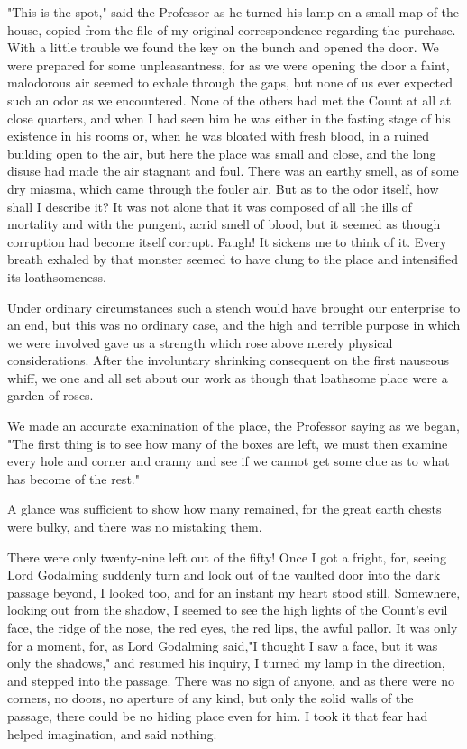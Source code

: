 "This is the spot," said the Professor as he turned his lamp on a small map of the house, copied from the file of my original correspondence regarding the purchase. With a little trouble we found the key on the bunch and opened the door. We were prepared for some unpleasantness, for as we were opening the door a faint, malodorous air seemed to exhale through the gaps, but none of us ever expected such an odor as we encountered. None of the others had met the Count at all at close quarters, and when I had seen him he was either in the fasting stage of his existence in his rooms or, when he was bloated with fresh blood, in a ruined building open to the air, but here the place was small and close, and the long disuse had made the air stagnant and foul. There was an earthy smell, as of some dry miasma, which came through the fouler air. But as to the odor itself, how shall I describe it? It was not alone that it was composed of all the ills of mortality and with the pungent, acrid smell of blood, but it seemed as though corruption had become itself corrupt. Faugh! It sickens me to think of it. Every breath exhaled by that monster seemed to have clung to the place and intensified its loathsomeness. 

Under ordinary circumstances such a stench would have brought our enterprise to an end, but this was no ordinary case, and the high and terrible purpose in which we were involved gave us a strength which rose above merely physical considerations. After the involuntary shrinking consequent on the first nauseous whiff, we one and all set about our work as though that loathsome place were a garden of roses. 

We made an accurate examination of the place, the Professor saying as we began, "The first thing is to see how many of the boxes are left, we must then examine every hole and corner and cranny and see if we cannot get some clue as to what has become of the rest." 

A glance was sufficient to show how many remained, for the great earth chests were bulky, and there was no mistaking them. 

There were only twenty-nine left out of the fifty! Once I got a fright, for, seeing Lord Godalming suddenly turn and look out of the vaulted door into the dark passage beyond, I looked too, and for an instant my heart stood still. Somewhere, looking out from the shadow, I seemed to see the high lights of the Count's evil face, the ridge of the nose, the red eyes, the red lips, the awful pallor. It was only for a moment, for, as Lord Godalming said,"I thought I saw a face, but it was only the shadows," and resumed his inquiry, I turned my lamp in the direction, and stepped into the passage. There was no sign of anyone, and as there were no corners, no doors, no aperture of any kind, but only the solid walls of the passage, there could be no hiding place even for him. I took it that fear had helped imagination, and said nothing. 

